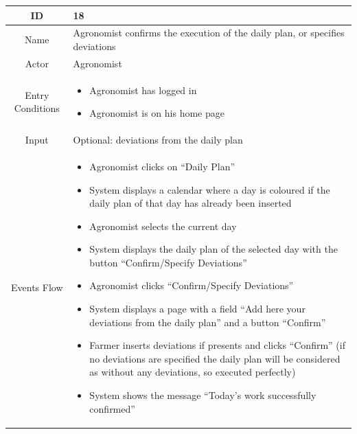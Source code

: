 \documentclass{article}
\begin{document}
\begin{center}
    \newpage
    
    
    
    
    
    
    
    
    
    
    \begin{longtable}{|c| p{10cm}|}
        \hline
            ID & 18 \\
        \hline
            Name & Agronomist confirms the execution of the daily plan, or specifies deviations\\
        \hline
            Actor & Agronomist \\
        \hline
            Entry Conditions &  \begin{itemize}
                                    \item Agronomist has logged in
                                    \item Agronomist is on his home page
                                \end{itemize}\\
        \hline
            Input & Optional: deviations from the daily plan \\
        \hline
            Events Flow &   \begin{itemize}
                                \item Agronomist clicks on “Daily Plan” 
                                \item System displays a calendar where a day is coloured if the daily plan of that day has already been inserted
                                \item Agronomist selects the current day 
                                \item System displays the daily plan of the selected day with the button “Confirm/Specify Deviations” 
                                \item Agronomist clicks “Confirm/Specify Deviations”
                                \item System displays a page with a field “Add here your deviations from the daily plan” and a button “Confirm”
                                \item Farmer inserts deviations if presents and clicks “Confirm” (if no deviations are specified the daily plan will be considered as without any deviations, so executed perfectly)
                                \item System shows the message “Today’s work successfully confirmed” 

\end{itemize}
\end{longtable}
\end{center}
\end{document}
